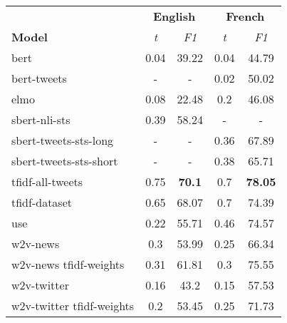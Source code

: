 \begin{tabular}{|l|cc|cc|}
\hline
                           &\multicolumn{2}{c}{\textbf{English}}&\multicolumn{2}{|c|}{\textbf{French}}\\
\cline{2-5}
                   \textbf{Model}  & \textit{t} & \textit{F1} & \textit{t} & \textit{F1} \\
\hline
                     bert  &       0.04 &       39.22 &       0.04 &       44.79 \\
              bert-tweets  &          - &           - &       0.02 &       50.02 \\
                     elmo  &       0.08 &       22.48 &        0.2 &       46.08 \\
            sbert-nli-sts  &       0.39 &       58.24 &          - &           - \\
    sbert-tweets-sts-long  &          - &           - &       0.36 &       67.89 \\
   sbert-tweets-sts-short  &          - &           - &       0.38 &       65.71 \\
         tfidf-all-tweets  &       0.75 &\textbf{70.1}&        0.7 &\textbf{78.05}\\
            tfidf-dataset  &       0.65 &       68.07 &        0.7 &       74.39 \\
                      use  &       0.22 &       55.71 &       0.46 &       74.57 \\
                 w2v-news  &        0.3 &       53.99 &       0.25 &       66.34 \\
    w2v-news tfidf-weights &       0.31 &       61.81 &        0.3 &       75.55 \\
              w2v-twitter  &       0.16 &        43.2 &       0.15 &       57.53 \\
 w2v-twitter tfidf-weights &        0.2 &       53.45 &       0.25 &       71.73 \\
\hline
\end{tabular}

